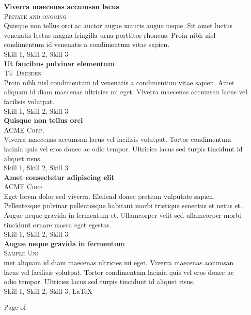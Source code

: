 \documentclass{article}
\begin{document}
{\begin{minipage}[t][\dimexpr\textheight-2\fboxrule-2\fboxsep\relax][t]{\dimexpr0.6\textwidth-2\fboxrule-2\fboxsep\relax}
\begin{justify}
        {\large \textbf{Viverra maecenas accumsan lacus}} \\
        {\scshape{}\selectfont\footnotesize Private  and ongoing} \\
        Quisque non tellus orci ac auctor augue mauris augue neque. Sit amet luctus venenatis lectus magna fringilla urna porttitor rhoncus. Proin nibh nisl condimentum id venenatis a condimentum vitae sapien. \\[1ex]
        Skill 1, Skill 2, Skill 3 \\
        
        {\large \textbf{Ut faucibus pulvinar elementum}} \\
        {\scshape{}\selectfont\footnotesize TU Dresden } \\
        Proin nibh nisl condimentum id venenatis a condimentum vitae sapien. Amet aliquam id diam maecenas ultricies mi eget. Viverra maecenas accumsan lacus vel facilisis volutpat. \\[1ex]
        Skill 1, Skill 2, Skill 3 \\

        {\large \textbf{Quisque non tellus orci}} \\
        {\scshape{}\selectfont\footnotesize ACME Corp. } \\
        Viverra maecenas accumsan lacus vel facilisis volutpat. Tortor condimentum lacinia quis vel eros donec ac odio tempor. Ultricies lacus sed turpis tincidunt id aliquet risus. \\[1ex]
        Skill 1, Skill 2, Skill 3 \\
        
        {\large \textbf{Amet consectetur adipiscing elit}} \\
        {\scshape{}\selectfont\footnotesize ACME Corp } \\
        Eget lorem dolor sed viverra. Eleifend donec pretium vulputate sapien. Pellentesque pulvinar pellentesque habitant morbi tristique senectus et netus et. Augue neque gravida in fermentum et. Ullamcorper velit sed ullamcorper morbi tincidunt ornare massa eget egestas. \\[1ex]
        Skill 1, Skill 2, Skill 3 \\
        
        {\large \textbf{Augue neque gravida in fermentum}} \\
        {\scshape{}\selectfont\footnotesize Sample Uni } \\
        met aliquam id diam maecenas ultricies mi eget. Viverra maecenas accumsan lacus vel facilisis volutpat. Tortor condimentum lacinia quis vel eros donec ac odio tempor. Ultricies lacus sed turpis tincidunt id aliquet risus. \\[1ex]
        Skill 1, Skill 2, Skill 3, \LaTeX 
        \end{justify}
        \vfill%
        {\hfill\small{}\selectfont Page \thepage of \pageref{LastPage}\hfill}
    \end{minipage}
}
\end{document}
